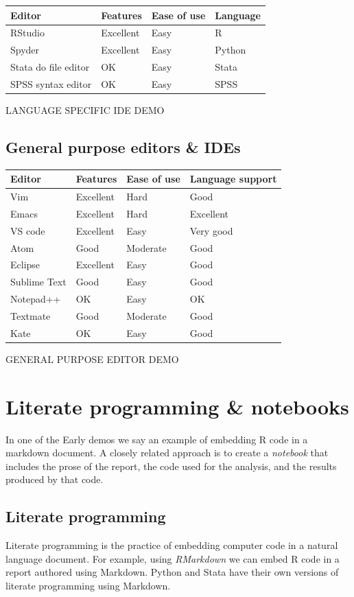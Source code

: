 \documentclass[
]{book}
\begin{document}
\begin{longtable}[]{@{}llll@{}}
\toprule
Editor & Features & Ease of use & Language\tabularnewline
\midrule
\endhead
RStudio & Excellent & Easy & R\tabularnewline
Spyder & Excellent & Easy & Python\tabularnewline
Stata do file editor & OK & Easy & Stata\tabularnewline
SPSS syntax editor & OK & Easy & SPSS\tabularnewline
\bottomrule
\end{longtable}

LANGUAGE SPECIFIC IDE DEMO

\hypertarget{general-purpose-editors-ides}{%
\subsection{General purpose editors \& IDEs}\label{general-purpose-editors-ides}}

\begin{longtable}[]{@{}llll@{}}
\toprule
Editor & Features & Ease of use & Language support\tabularnewline
\midrule
\endhead
Vim & Excellent & Hard & Good\tabularnewline
Emacs & Excellent & Hard & Excellent\tabularnewline
VS code & Excellent & Easy & Very good\tabularnewline
Atom & Good & Moderate & Good\tabularnewline
Eclipse & Excellent & Easy & Good\tabularnewline
Sublime Text & Good & Easy & Good\tabularnewline
Notepad++ & OK & Easy & OK\tabularnewline
Textmate & Good & Moderate & Good\tabularnewline
Kate & OK & Easy & Good\tabularnewline
\bottomrule
\end{longtable}

GENERAL PURPOSE EDITOR DEMO

\hypertarget{literate-programming-notebooks}{%
\section{Literate programming \& notebooks}\label{literate-programming-notebooks}}

In one of the Early demos we say an example of embedding R code in a markdown document. A closely related approach is to create a \emph{notebook} that includes the prose of the report, the code used for the analysis, and the results produced by that code.

\hypertarget{literate-programming}{%
\subsection{Literate programming}\label{literate-programming}}

Literate programming is the practice of embedding computer code in a natural language document. For example, using \emph{RMarkdown} we can embed R code in a report authored using Markdown. Python and Stata have their own versions of literate programming using Markdown.
\end{document}
